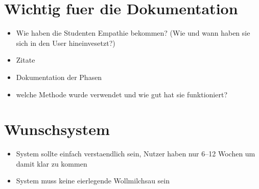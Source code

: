 \chapter{Wichtig fuer die Dokumentation}
\label{wichtigfuerdiedokumentation}

\begin{itemize}
\item Wie haben die Studenten Empathie bekommen? (Wie und wann haben sie sich in den User hineinvesetzt?)

\item Zitate

\item Dokumentation der Phasen

\item welche Methode wurde verwendet und wie gut hat sie funktioniert?

\end{itemize}

\chapter{Wunschsystem}
\label{wunschsystem}

\begin{itemize}
\item System sollte einfach verstaendlich sein, Nutzer haben nur 6--12 Wochen um damit klar zu kommen

\item System muss keine eierlegende Wollmilchsau sein

\end{itemize}
